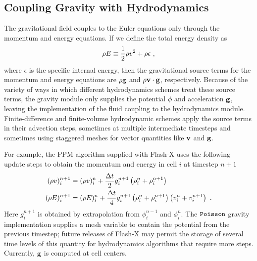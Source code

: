\subsection{Coupling Gravity with Hydrodynamics}

The gravitational field couples to the Euler equations only through the
momentum and energy equations. If we define the total energy density as
\begin{equation}
\rho E \equiv {1\over 2}\rho v^2 + \rho\epsilon\ ,
\end{equation}
where $\epsilon$ is the specific internal energy, then the gravitational
source terms for the momentum and energy equations are $\rho{\bf g}$ and
$\rho{\bf v}\cdot{\bf g}$, respectively. Because of the variety of ways
in which different hydrodynamics schemes treat these source terms,
the gravity module only supplies the potential $\phi$ and acceleration ${\bf g}$,
leaving the implementation
of the fluid coupling to the hydrodynamics module.
Finite-difference and finite-volume hydrodynamic schemes apply the source terms
in their advection steps,
sometimes at multiple intermediate timesteps and sometimes using
staggered meshes for vector quantities like ${\bf v}$ and ${\bf g}$.

For example, the PPM algorithm supplied with Flash-X uses the following
update steps to obtain the momentum and energy in cell $i$ at timestep
$n+1$
\begin{eqnarray}
\nonumber
(\rho v)_i^{n+1} & =  (\rho v)_i^n + {\Delta t\over 2} g_i^{n+1}
  \left(\rho_i^n + \rho_i^{n+1}\right)\\
(\rho E)_i^{n+1} & =  (\rho E)_i^n + {\Delta t\over 4} g_i^{n+1}
  \left(\rho_i^n + \rho_i^{n+1}\right)\left(v_i^n + v_i^{n+1}\right)\ .
\end{eqnarray}
Here $g_i^{n+1}$ is obtained by extrapolation from $\phi_i^{n-1}$ and
$\phi_i^n$.
The ${\tt Poisson}$ gravity implementation supplies a mesh variable to contain the
potential from the previous timestep; future releases of Flash-X may
permit the storage of several time levels of this quantity for
hydrodynamics algorithms that require more steps.
Currently, ${\bf g}$ is computed at cell centers.

